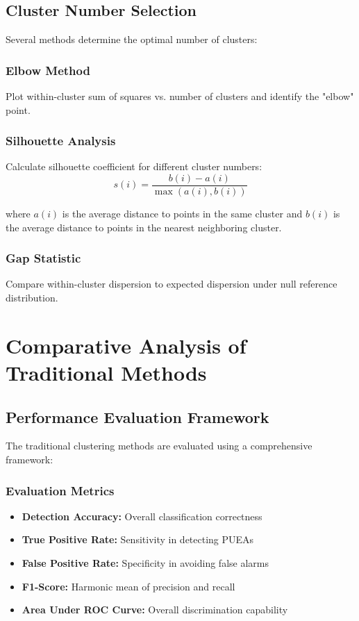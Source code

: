 \subsection{Cluster Number Selection}
Several methods determine the optimal number of clusters:

\subsubsection{Elbow Method}
Plot within-cluster sum of squares vs. number of clusters and identify the "elbow" point.

\subsubsection{Silhouette Analysis}
Calculate silhouette coefficient for different cluster numbers:
\begin{equation}
s(i) = \frac{b(i) - a(i)}{\max(a(i), b(i))}
\end{equation}

where $a(i)$ is the average distance to points in the same cluster and $b(i)$ is the average distance to points in the nearest neighboring cluster.

\subsubsection{Gap Statistic}
Compare within-cluster dispersion to expected dispersion under null reference distribution.

\section{Comparative Analysis of Traditional Methods}

\subsection{Performance Evaluation Framework}
The traditional clustering methods are evaluated using a comprehensive framework:

\subsubsection{Evaluation Metrics}
\begin{itemize}
\item \textbf{Detection Accuracy:} Overall classification correctness
\item \textbf{True Positive Rate:} Sensitivity in detecting PUEAs
\item \textbf{False Positive Rate:} Specificity in avoiding false alarms
\item \textbf{F1-Score:} Harmonic mean of precision and recall
\item \textbf{Area Under ROC Curve:} Overall discrimination capability
\end{itemize}

